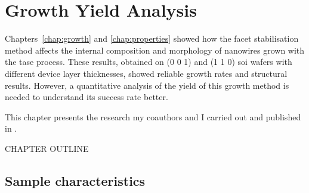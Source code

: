 \chapter{Growth Yield Analysis}
\label{chap:yield_analysis}

Chapters~\ref{chap:growth} and \ref{chap:properties} showed how the  facet stabilisation method affects the internal composition and morphology of nanowires grown with the \acf{tase} process. These results, obtained on \hkl(0 0 1) and \hkl(1 1 0) \acf{soi} wafers with different device layer thicknesses, showed reliable growth rates and structural results. However, a quantitative analysis of the yield of this growth method is needed to understand its success rate better. 

This chapter presents the research my coauthors and I carried out and published in \cite{Brugnolotto2023_2, Brugnolotto2024}.

CHAPTER OUTLINE

\section{Sample characteristics}

